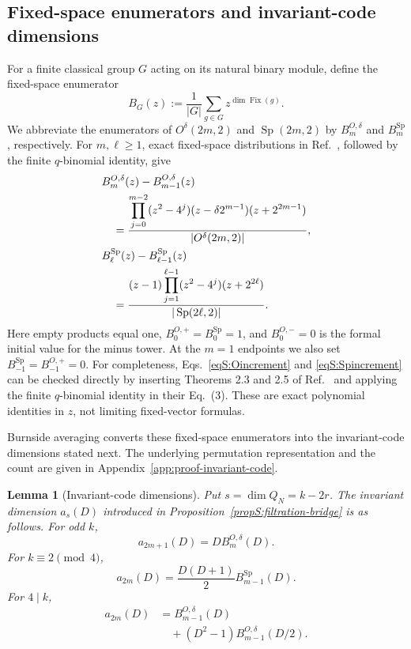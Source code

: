 \documentclass[journal,twocolumn]{IEEEtran}
\newtheorem{lemma}[theorem]{Lemma}
\theoremstyle{definition}
\theoremstyle{plain}
\newcommand{\Fix}{\operatorname{Fix}}
\newcommand{\Sp}{\operatorname{Sp}}
\begin{document}
\subsection{Fixed-space enumerators and invariant-code dimensions}
For a finite classical group $G$ acting on its natural binary module, define
the fixed-space enumerator
\begin{equation}
 B_G(z):=\frac1{|G|}\sum_{g\in G}z^{\dim\Fix(g)}.
 \label{eqS:fixed-enumerator}
\end{equation}
We abbreviate the enumerators of $O^\delta(2m,2)$ and $\Sp(2m,2)$ by
$B_m^{O,\delta}$ and $B_m^{\Sp}$, respectively.  For $m,\ell\geq1$,
exact fixed-space distributions in Ref.~\cite{FulmanStanton2016},
followed by the finite $q$-binomial identity, give
\begin{align}
 &B_m^{O,\delta}(z)-B_{m-1}^{O,\delta}(z)\notag\\
 &\quad=\frac{\displaystyle
 \prod_{j=0}^{m-2}(z^2-4^j)
 (z-\delta2^{m-1})(z+2^{2m-1})}
 {|O^\delta(2m,2)|},
 \label{eqS:Oincrement}\\
 &B_\ell^{\Sp}(z)-B_{\ell-1}^{\Sp}(z)\notag\\
 &\quad=\frac{\displaystyle
 (z-1)\prod_{j=1}^{\ell-1}(z^2-4^j)(z+2^{2\ell})}
 {|\Sp(2\ell,2)|}.
 \label{eqS:Spincrement}
\end{align}
Here empty products equal one, $B_0^{O,+}=B_0^{\Sp}=1$, and
$B_0^{O,-}=0$ is the formal initial value for the minus tower.  At the
$m=1$ endpoints we also set
$B_{-1}^{\Sp}=B_{-1}^{O,+}=0$.  For
completeness, Eqs.~\eqref{eqS:Oincrement} and \eqref{eqS:Spincrement} can be
checked directly by inserting Theorems 2.3 and 2.5 of
Ref.~\cite{FulmanStanton2016} and applying the finite $q$-binomial identity
in their Eq.~(3).  These are exact polynomial identities in $z$, not
limiting fixed-vector formulas.

Burnside averaging converts these fixed-space enumerators into the
invariant-code dimensions stated next.  The underlying permutation
representation and the count are given in Appendix~\ref{app:proof-invariant-code}.

\begin{lemma}[Invariant-code dimensions]
\label{lemS:invariant-code}
Put $s=\dim Q_N=k-2r$.  The invariant dimension $a_s(D)$ introduced in
Proposition~\ref{propS:filtration-bridge} is as follows.
For odd $k$,
\begin{equation}
 a_{2m+1}(D)=D B_m^{O,\delta}(D).
 \label{eqS:a-odd}
\end{equation}
For $k\equiv2\pmod4$,
\begin{equation}
 a_{2m}(D)=\frac{D(D+1)}2B_{m-1}^{\Sp}(D).
 \label{eqS:a-two}
\end{equation}
For $4\mid k$,
\begin{equation}
 \begin{aligned}
 a_{2m}(D)&=B_{m-1}^{O,\delta}(D)\\
 &\quad+(D^2-1)B_{m-1}^{O,\delta}(D/2).
 \end{aligned}
 \label{eqS:a-zero}
\end{equation}
\end{lemma}
\end{document}
